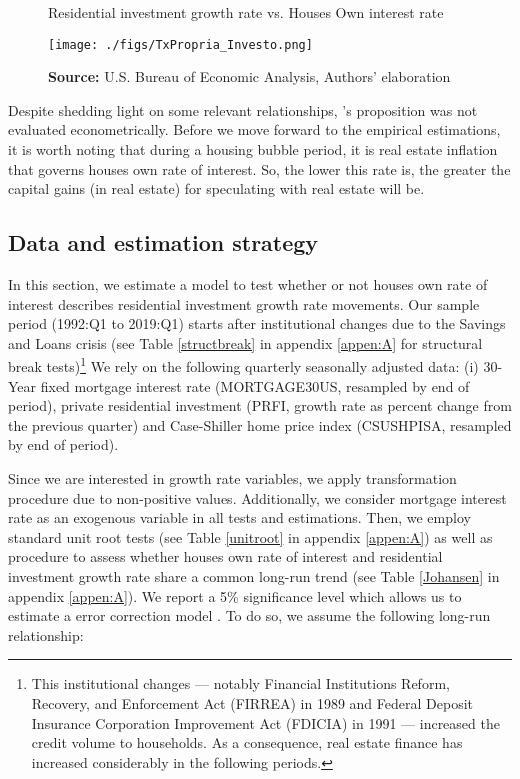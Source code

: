 \documentclass[12pt, a4paper]{article}
\begin{document}
\begin{figure}[htb]
	\centering
	\caption{Residential investment growth rate vs. Houses Own interest rate}
	\label{propria_investo}
	\texttt{[image: ./figs/TxPropria\_Investo.png]}
	\caption*{\textbf{Source:} U.S. Bureau of Economic Analysis, Authors' elaboration}
\end{figure}

Despite shedding light on some relevant relationships, \citeauthor*{teixeira_crescimento_2015}'s \citeyear{teixeira_crescimento_2015} proposition was not evaluated econometrically.
Before we move forward to the empirical estimations, it is worth noting that during a housing bubble period, it is real estate inflation that governs houses own rate of interest.
So, the lower this rate is, the greater the capital gains (in real estate) for speculating with real estate will be.


\subsection{Data and estimation strategy}
\label{sec:orgc14cd86}
\label{sec:estimation}


In this section, we estimate a model to test whether or not houses own rate of interest describes residential investment growth rate movements.
Our sample period (1992:Q1 to 2019:Q1) starts after institutional changes due to the Savings and Loans crisis (see Table \ref{structbreak} in appendix \ref{appen:A} for structural break tests)\footnote{This institutional changes --- notably Financial Institutions Reform, Recovery, and Enforcement Act (FIRREA) in 1989 and Federal Deposit Insurance Corporation Improvement Act  (FDICIA) in 1991 --- increased the credit volume to households. As a consequence, real estate finance has increased considerably in the following periods.}
We rely on the following  quarterly seasonally adjusted data: (i) 30-Year fixed mortgage interest rate (MORTGAGE30US, resampled by end of period), private residential investment (PRFI, growth rate as percent change from the previous quarter) and Case-Shiller home price index
(CSUSHPISA, resampled by end of period).



Since we are interested in growth rate variables, we apply \textcite{yeo_new_2000} transformation procedure due to non-positive values.
Additionally, we consider mortgage interest rate as an exogenous variable in all tests and estimations.
Then, we employ standard unit root tests (see Table \ref{unitroot} in appendix \ref{appen:A}) as well as \textcite{johansen_estimation_1991} procedure to assess whether houses own rate of interest and residential investment growth rate share a common long-run trend (see Table \ref{Johansen} in appendix \ref{appen:A}).
We report a 5\% significance level which allows us to estimate a error correction model \cite{enders_applied_2014}.
To do so, we assume the following long-run relationship:
\end{document}
